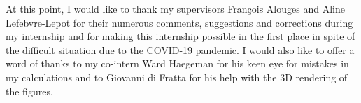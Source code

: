 At this point, I would like to thank my supervisors François Alouges and Aline Lefebvre-Lepot for their numerous comments, suggestions and corrections during my internship and for making this internship possible in the first place in spite of the difficult situation due to the COVID-19 pandemic. I would also like to offer a word of thanks to my co-intern Ward Haegeman for his keen eye for mistakes in my calculations and to Giovanni di Fratta for his help with the 3D rendering of the figures.